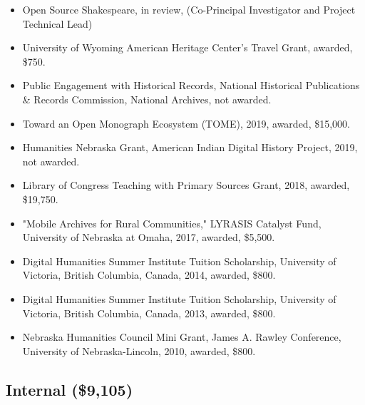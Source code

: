 \documentclass[10pt]{article}
\begin{document}
\begin{itemize}
  \item Open Source Shakespeare, in review, (Co-Principal Investigator and Project Technical Lead)
  \item University of Wyoming American Heritage Center's Travel Grant, awarded, \$750.
  \item Public Engagement with Historical Records, National Historical Publications \& Records Commission, National Archives, not awarded.
  \item Toward an Open Monograph Ecosystem (TOME), 2019, awarded, \$15,000.
  \item Humanities Nebraska Grant, American Indian Digital History Project, 2019, not awarded.
  \item Library of Congress Teaching with Primary Sources Grant, 2018, awarded, \$19,750.
  \item "Mobile Archives for Rural Communities," LYRASIS Catalyst Fund, University of Nebraska at Omaha, 2017, awarded, \$5,500.
  \item Digital Humanities Summer Institute Tuition Scholarship, University of Victoria, British Columbia, Canada, 2014, awarded, \$800.
  \item Digital Humanities Summer Institute Tuition Scholarship, University of Victoria, British Columbia, Canada, 2013, awarded, \$800.
  \item Nebraska Humanities Council Mini Grant, James A. Rawley Conference, University of Nebraska-Lincoln, 2010, awarded, \$800.
\end{itemize}

\subsection*{Internal (\$9,105)}
\end{document}
